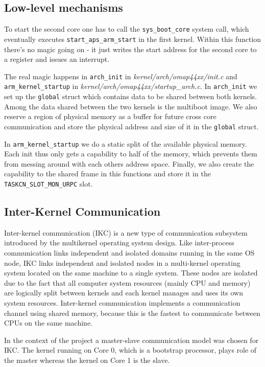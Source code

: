 \documentclass[a4paper,10pt]{article}
\newcommand{\filepath}[1]{\emph{ #1}}
\begin{document}
\subsection{Low-level mechanisms}
\label{sec:low-level-mechanisms}

To start the second core one has to call the \lstinline!sys_boot_core! system call, which eventually executes \lstinline!start_aps_arm_start! in the first kernel.
Within this function there's no magic going on - it just writes the start address for the second core to a register and issues an interrupt.

The real magic happens in \lstinline!arch_init! in \filepath{kernel/arch/omap44xx/init.c} and  \lstinline{arm_kernel_startup} in \filepath{kernel/arch/omap44xx/startup\_arch.c}.
In \lstinline!arch_init! we set up the \lstinline!global! struct which contains data to be shared between both kernels.
Among the data shared between the two kernels is the multiboot image.
We also reserve a region of physical memory as a buffer for future cross core communication and store the physical address and size of it in the \lstinline!global! struct.

In \lstinline!arm_kernel_startup! we do a static split of the available physical memory.
Each init thus only gets a capability to half of the memory, which prevents them from messing around with each others address space.
Finally, we also create the capability to the shared frame in this functions and store it in the \lstinline!TASKCN_SLOT_MON_URPC! slot.

\subsection{Inter-Kernel Communication}
	Inter-kernel communication (IKC) is a new type of communication subsystem introduced by the multikernel operating system design.
	Like inter-process communication links independent and isolated domains running in the same OS node, IKC links independent and isolated nodes in a multi-kernel operating system located on the same machine to a single system.
	These nodes are isolated due to the fact that all computer system resources (mainly CPU and memory) are logically split between kernels and each kernel manages and uses its own system resources. 
	Inter-kernel communication implements a communication channel using shared memory, because this is the fastest to communicate between CPUs on the same machine.
	
	In the context of the project a master-slave communication model was chosen for IKC. 
	The kernel running on Core 0,
	which is a bootstrap processor, plays role of the master whereas the kernel on Core 1 is the slave.
	
\end{document}
